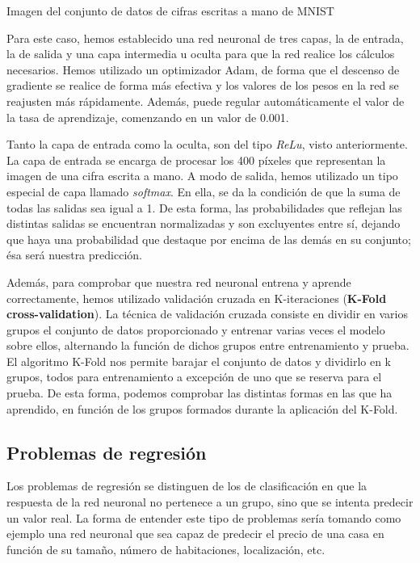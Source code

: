 %
       {Imagen del conjunto de datos de cifras escritas a mano de MNIST \citep{Lecun98gradient-basedlearning}} 

Para este caso, hemos establecido una red neuronal de tres capas, la de entrada, la de salida y una capa intermedia u oculta para que la red realice los cálculos necesarios. Hemos utilizado un optimizador Adam, de forma que el descenso de gradiente se realice de forma más efectiva y los valores de los pesos en la red se reajusten más rápidamente. Además, puede regular automáticamente el valor de la tasa de aprendizaje, comenzando en un valor de 0.001.

Tanto la capa de entrada como la oculta, son del tipo \textit{ReLu}, visto anteriormente. La capa de entrada se encarga de procesar los 400 píxeles que representan la imagen de una cifra escrita a mano. A modo de salida, hemos utilizado un tipo especial de capa llamado \textit{softmax}. En ella, se da la condición de que la suma de todas las salidas sea igual a 1. De esta forma, las probabilidades que reflejan las distintas salidas se encuentran normalizadas y son excluyentes entre sí, dejando que haya una probabilidad que destaque por encima de las demás en su conjunto; ésa será nuestra predicción. 

Además, para comprobar que nuestra red neuronal entrena y aprende correctamente, hemos utilizado validación cruzada en K-iteraciones (\textbf{K-Fold cross-validation}). La técnica de validación cruzada consiste en dividir en varios grupos el conjunto de datos proporcionado y entrenar varias veces el modelo sobre ellos, alternando la función de dichos grupos entre entrenamiento y prueba. El algoritmo K-Fold nos permite barajar el conjunto de datos y dividirlo en k grupos, todos para entrenamiento a excepción de uno que se reserva para el prueba. De esta forma, podemos comprobar las distintas formas en las que ha aprendido, en función de los grupos formados durante la aplicación del K-Fold.

\subsection{Problemas de regresión}
Los problemas de regresión se distinguen de los de clasificación en que la respuesta de la red neuronal no pertenece a un grupo, sino que se intenta predecir un valor real. La forma de entender este tipo de problemas sería tomando como ejemplo una red neuronal que sea capaz de predecir el precio de una casa en función de su tamaño, número de habitaciones, localización, etc.

